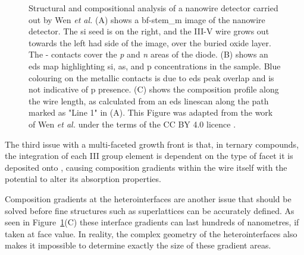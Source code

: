 \begin{figure}
    \centering
    \caption[Structural and compositional analysis of a nanowire detector.]{Structural and compositional analysis of a nanowire detector carried out by Wen \textit{et al.} (A) shows a \acs{bf}-\acs{stem_m} image of the nanowire detector. The \acs{si} seed is on the right, and the III-V wire grows out towards the left had side of the image, over the buried oxide layer. The - contacts cover the \textit{p} and \textit{n} areas of the diode. (B) shows an \acs{eds} map highlighting \acs{si}, \acs{as}, and \acs{p} concentrations in the sample. Blue colouring on the metallic contacts is due to \acs{eds} peak overlap and is not indicative of \acs{p} presence. (C) shows the composition profile along the wire length, as calculated from an \acs{eds} linescan along the path marked as "Line 1" in (A). This Figure was adapted from the work of Wen \textit{et al.} \cite{Wen2022} under the terms of the CC BY 4.0 licence \cite{CCBY40}.}
    \label{fig:wen}
\end{figure}

The third issue with a multi-faceted growth front is that, in ternary compounds, the integration of each III group element is dependent on the type of facet it is deposited onto \cite{Borg2019}, causing composition gradients within the wire itself with the potential to alter its absorption properties.

Composition gradients at the heterointerfaces are another issue that should be solved before fine structures such as superlattices can be accurately defined. As seen in Figure~\ref{fig:wen}(C) these interface gradients can last hundreds of nanometres, if taken at face value. In reality, the complex geometry of the heterointerfaces also makes it impossible to determine exactly the size of these gradient areas.

